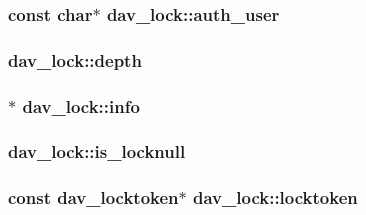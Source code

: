 \subsubsection[{\texorpdfstring{auth\+\_\+user}{auth_user}}]{\setlength{\rightskip}{0pt plus 5cm}const char$\ast$ dav\+\_\+lock\+::auth\+\_\+user}\hypertarget{structdav__lock_a109abbfc333fac81ae0efb15797b474a}{}\label{structdav__lock_a109abbfc333fac81ae0efb15797b474a}
\subsubsection[{\texorpdfstring{depth}{depth}}]{ dav\+\_\+lock\+::depth}\hypertarget{structdav__lock_a5bb85bc71ec6944b0f93c9b7b80877ae}{}\label{structdav__lock_a5bb85bc71ec6944b0f93c9b7b80877ae}
\subsubsection[{\texorpdfstring{info}{info}}]{$\ast$ dav\+\_\+lock\+::info}\hypertarget{structdav__lock_af44ee5be5aa2545cc845667939c2277f}{}\label{structdav__lock_af44ee5be5aa2545cc845667939c2277f}
\subsubsection[{\texorpdfstring{is\+\_\+locknull}{is_locknull}}]{ dav\+\_\+lock\+::is\+\_\+locknull}\hypertarget{structdav__lock_a4784c04d6e4795b75cecede0470afddb}{}\label{structdav__lock_a4784c04d6e4795b75cecede0470afddb}
\subsubsection[{\texorpdfstring{locktoken}{locktoken}}]{\setlength{\rightskip}{0pt plus 5cm}const {\bf dav\+\_\+locktoken}$\ast$ dav\+\_\+lock\+::locktoken}\hypertarget{structdav__lock_a5ba4dd1e2e44354d831fc83099b56a37}{}\label{structdav__lock_a5ba4dd1e2e44354d831fc83099b56a37}
